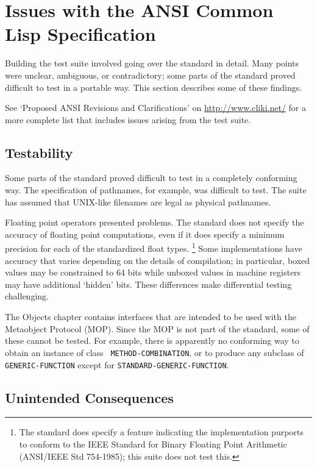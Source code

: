 \documentclass[11pt]{article}
\begin{document}
\section {Issues with the ANSI Common Lisp Specification}

Building the test suite involved going over the standard in detail.
Many points were unclear, ambiguous, or contradictory; some
parts of the standard proved difficult to test in a portable
way.  This section describes some of these findings.

See `Proposed ANSI Revisions and Clarifications' on
\url{http://www.cliki.net/} for a more complete list that includes
issues arising from the test suite.

\subsection {Testability}

Some parts of the standard proved difficult to test in a completely
conforming way.  The specification of pathnames, for example, was
difficult to test.  The suite has assumed that UNIX-like filenames
are legal as physical pathnames.

Floating point operators presented problems.  The standard does not
specify the accuracy of floating point computations, even if it
does specify a minimum precision for each of the standardized float
types. \footnote{The standard does specify a feature indicating
the implementation purports to conform to the IEEE Standard for Binary
Floating Point Arithmetic (ANSI/IEEE Std 754-1985); this suite
does not test this.}  Some implementations have accuracy that varies
depending on the details of compilation; in particular, boxed values
may be constrained to 64 bits while unboxed values in machine
registers may have additional `hidden' bits.  These differences
make differential testing challenging.

The Objects chapter contains interfaces that are intended to be used
with the Metaobject Protocol (MOP).  Since the MOP is not part of the
standard, some of these cannot be tested.  For example, there is
apparently no conforming way to obtain an instance of class {\tt
METHOD-COMBINATION}, or to produce any subclass of {\tt
GENERIC-FUNCTION} except for {\tt STANDARD-GENERIC-FUNCTION}.

\subsection {Unintended Consequences}
\end{document}
